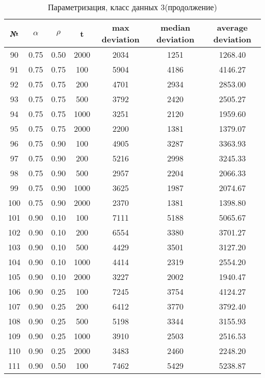 \documentclass[a4paper, 12pt, unknownkeysallowed]{extreport}
\begin{document}
\begin{center}
  \captionsetup{justification=raggedright,singlelinecheck=off}
  \begin{longtable}[c]{|c|c|c|c|c|c|c|}
  \caption{Параметризация, класс данных 3(продолжение)\label{tbl:p_3_3}} \\ \hline
  № & $\alpha$ & $\rho$ & t & max deviation & median deviation & average deviation \\ \hline   
  90 & 0.75 & 0.50 &  2000 & 2034 & 1251 & 1268.40 \\ \hline
  91 & 0.75 & 0.75 &   100 & 5904 & 4186 & 4146.27 \\ \hline
  92 & 0.75 & 0.75 &   200 & 4701 & 2934 & 2853.00 \\ \hline
  93 & 0.75 & 0.75 &   500 & 3792 & 2420 & 2505.27 \\ \hline
  94 & 0.75 & 0.75 &  1000 & 3251 & 2120 & 1959.60 \\ \hline
  95 & 0.75 & 0.75 &  2000 & 2200 & 1381 & 1379.07 \\ \hline
  96 & 0.75 & 0.90 &   100 & 4905 & 3287 & 3363.93 \\ \hline
  97 & 0.75 & 0.90 &   200 & 5216 & 2998 & 3245.33 \\ \hline
  98 & 0.75 & 0.90 &   500 & 2957 & 2204 & 2066.33 \\ \hline
  99 & 0.75 & 0.90 &  1000 & 3625 & 1987 & 2074.67 \\ \hline
 100 & 0.75 & 0.90 &  2000 & 2370 & 1381 & 1398.80 \\ \hline
 101 & 0.90 & 0.10 &   100 & 7111 & 5188 & 5065.67 \\ \hline
 102 & 0.90 & 0.10 &   200 & 6554 & 3380 & 3701.27 \\ \hline
 103 & 0.90 & 0.10 &   500 & 4429 & 3501 & 3127.20 \\ \hline
 104 & 0.90 & 0.10 &  1000 & 4414 & 2319 & 2554.20 \\ \hline
 105 & 0.90 & 0.10 &  2000 & 3227 & 2002 & 1940.47 \\ \hline
 106 & 0.90 & 0.25 &   100 & 7245 & 3754 & 4124.27 \\ \hline
 107 & 0.90 & 0.25 &   200 & 6412 & 3770 & 3792.40 \\ \hline
 108 & 0.90 & 0.25 &   500 & 5198 & 3344 & 3155.93 \\ \hline
 109 & 0.90 & 0.25 &  1000 & 3910 & 2503 & 2516.53 \\ \hline
 110 & 0.90 & 0.25 &  2000 & 3483 & 2460 & 2248.20 \\ \hline
 111 & 0.90 & 0.50 &   100 & 7462 & 5429 & 5238.87 \\ \hline

\end{longtable}
\end{center}
\end{document}
